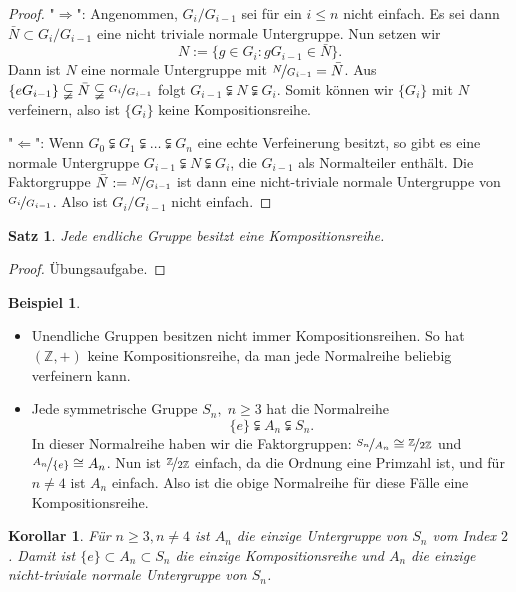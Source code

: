 \documentclass[12pt]{scrartcl}%
\newtheorem{thm}{Satz}
\newtheorem{kor}{Korollar}
\theoremstyle{definition}
\newtheorem{ex}{Beispiel}
\theoremstyle{remark}
\begin{document}
\begin{proof}
    "$\Rightarrow$": Angenommen, $G_i/G_{i-1}$ sei für ein $i\leq n$ nicht einfach. Es sei dann $\bar{N}\subset G_i/G_{i-1}$ eine nicht triviale normale Untergruppe. Nun setzen wir 
        \[N:=\{g\in G_i: gG_{i-1}\in\bar{N}\}.\]
    Dann ist $N$ eine normale Untergruppe mit $\nicefrac{N}{G_{i-1}}=\bar{N}$. Aus $\{eG_{i-1}\}\subsetneqq\bar{N}\subsetneqq\nicefrac{G_i}{G_{i-1}}$ folgt $G_{i-1}\subsetneqq N\subsetneqq G_i$. Somit können wir $\{G_i\}$ mit $N$ verfeinern, also ist $\{G_i\}$ keine Kompositionsreihe.
    
    "$\Leftarrow$": Wenn $G_0\subsetneqq G_1\subsetneqq\dots\subsetneqq G_n$ eine echte Verfeinerung besitzt, so gibt es eine normale Untergruppe $G_{i-1}\subsetneqq N\subsetneqq G_i$, die $G_{i-1}$ als Normalteiler enthält. Die Faktorgruppe $\bar{N}:=\nicefrac{N}{G_{i-1}}$ ist dann eine nicht-triviale normale Untergruppe von $\nicefrac{G_i}{G_{i-1}}$. Also ist $G_i/G_{i-1}$ nicht einfach.
\end{proof}

\begin{thm}
    Jede endliche Gruppe besitzt eine Kompositionsreihe.
\end{thm}

\begin{proof}
    Übungsaufgabe.
\end{proof}

\begin{ex}

    \begin{itemize}
        \item Unendliche Gruppen besitzen nicht immer Kompositionsreihen. So hat $(\mathbb{Z},+)$ keine Kompositionsreihe, da man jede Normalreihe beliebig verfeinern kann.
        \item Jede symmetrische Gruppe $S_n,\; n\geq 3$ hat die Normalreihe
            \[\{e\}\subsetneqq A_n \subsetneqq S_n.\]
            In dieser Normalreihe haben wir die Faktorgruppen: $\nicefrac{S_n}{A_n}\cong\nicefrac{\mathbb{Z}}{2\mathbb{Z}}$ und $\nicefrac{A_n}{\{e\}}\cong A_n$. Nun ist $\nicefrac{\mathbb{Z}}{2\mathbb{Z}}$ einfach, da die Ordnung eine Primzahl ist, und für $n\neq 4$ ist $A_n$ einfach. Also ist die obige Normalreihe für diese Fälle eine Kompositionsreihe.
    \end{itemize}
\end{ex}

\begin{kor}
    Für $n\geq 3,n\neq 4$ ist $A_n$ die einzige Untergruppe von $S_n$ vom Index $2$. Damit ist $\{e\}\subset A_n\subset S_n$ die einzige Kompositionsreihe und $A_n$ die einzige nicht-triviale normale Untergruppe von $S_n$.
\end{kor}
\end{document}
